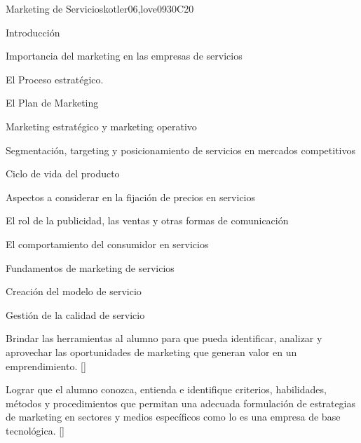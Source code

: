 \begin{syllabus}
\begin{unit}{}{Marketing de Servicios}{kotler06,love09}{30}{C20}
\begin{topics}
      \item Introducción
      \item Importancia del marketing en las empresas de servicios
      \item El Proceso estratégico.
      \item El Plan de Marketing
      \item Marketing estratégico y marketing operativo
      \item Segmentación, targeting y posicionamiento de servicios en mercados competitivos
      \item Ciclo de vida del producto
       \item Aspectos a considerar en la fijación de precios en servicios
       \item El rol de la publicidad, las ventas y otras formas de comunicación
      \item El comportamiento del consumidor en servicios
      \item Fundamentos de marketing de servicios
      \item Creación del modelo de servicio
      \item Gestión de la calidad de servicio
   \end{topics}
   \begin{learningoutcomes}
      \item Brindar las herramientas al alumno para que pueda identificar, analizar y aprovechar las oportunidades de marketing que generan valor en un emprendimiento. [\Usage]
      \item Lograr que el alumno conozca, entienda e identifique criterios, habilidades, métodos y procedimientos que permitan una adecuada formulación de estrategias de marketing en sectores y medios específicos como lo es una empresa de base tecnológica. [\Usage]
   \end{learningoutcomes}
\end{unit}


\end{syllabus}
